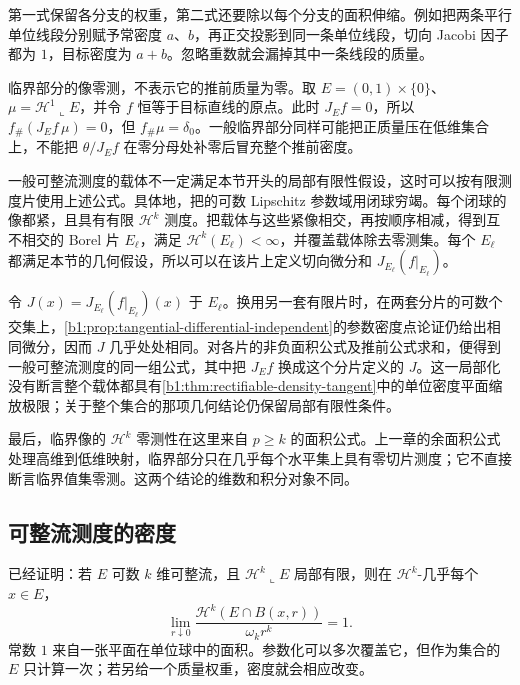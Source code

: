 第一式保留各分支的权重，第二式还要除以每个分支的面积伸缩。例如把两条平行单位线段分别赋予常密度 \(a\)、\(b\)，再正交投影到同一条单位线段，切向 Jacobi 因子都为 \(1\)，目标密度为 \(a+b\)。忽略重数就会漏掉其中一条线段的质量。

\ProseParagraphBreak

临界部分的像零测，不表示它的推前质量为零。取 \(E=(0,1)\times\{0\}\)、\(\mu=\mathcal H^1\llcorner E\)，并令 \(f\) 恒等于目标直线的原点。此时 \(J_Ef=0\)，所以 \(f_\#(J_Ef\,\mu)=0\)，但 \(f_\#\mu=\delta_0\)。一般临界部分同样可能把正质量压在低维集合上，不能把 \(\theta/J_Ef\) 在零分母处补零后冒充整个推前密度。

\ProseParagraphBreak

一般可整流测度的载体不一定满足本节开头的局部有限性假设，这时可以按有限测度片使用上述公式。具体地，把的可数 Lipschitz 参数域用闭球穷竭。每个闭球的像都紧，且具有有限 \(\mathcal H^k\) 测度。把载体与这些紧像相交，再按顺序相减，得到互不相交的 Borel 片 \(E_\ell\)，满足 \(\mathcal H^k(E_\ell)<\infty\)，并覆盖载体除去零测集。每个 \(E_\ell\) 都满足本节的几何假设，所以可以在该片上定义切向微分和 \(J_{E_\ell}(f|_{E_\ell})\)。

\ProseParagraphBreak

令 \(J(x)=J_{E_\ell}(f|_{E_\ell})(x)\) 于 \(E_\ell\)。换用另一套有限片时，在两套分片的可数个交集上，\cref{b1:prop:tangential-differential-independent}的参数密度点论证仍给出相同微分，因而 \(J\) 几乎处处相同。对各片的非负面积公式及推前公式求和，便得到一般可整流测度的同一组公式，其中把 \(J_Ef\) 换成这个分片定义的 \(J\)。这一局部化没有断言整个载体都具有\cref{b1:thm:rectifiable-density-tangent}中的单位密度平面缩放极限；关于整个集合的那项几何结论仍保留局部有限性条件。

\ProseParagraphBreak

最后，临界像的 \(\mathcal H^k\) 零测性在这里来自 \(p\geq k\) 的面积公式。上一章的余面积公式处理高维到低维映射，临界部分只在几乎每个水平集上具有零切片测度；它不直接断言临界值集零测。这两个结论的维数和积分对象不同。

\subsection{可整流测度的密度}
\label{b1:subsec:190401}

已经证明：若 \(E\) 可数 \(k\) 维可整流，且 \(\mathcal H^k\llcorner E\) 局部有限，则在 \(\mathcal H^k\)-几乎每个 \(x\in E\)，
\[
 \lim_{r\downarrow0}\frac{\mathcal H^k(E\cap B(x,r))}{\omega_kr^k}=1.
\]
常数 \(1\) 来自一张平面在单位球中的面积。参数化可以多次覆盖它，但作为集合的 \(E\) 只计算一次；若另给一个质量权重，密度就会相应改变。

